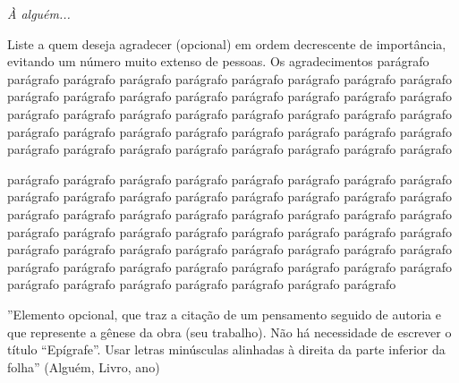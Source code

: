 
\begin{dedicatoria}
   \vspace*{\fill}
   \vspace*{\fill}
   \vspace*{\fill}
   \vspace*{\fill}
   \flushright
   \noindent
   \textit{À alguém...}
   \vspace*{48pt}
\end{dedicatoria}

\begin{agradecimentos}
Liste a quem deseja agradecer (opcional) em ordem decrescente de importância, evitando um número muito extenso de pessoas.
Os agradecimentos parágrafo parágrafo parágrafo parágrafo parágrafo parágrafo parágrafo parágrafo parágrafo parágrafo parágrafo parágrafo parágrafo parágrafo parágrafo parágrafo parágrafo parágrafo parágrafo parágrafo parágrafo parágrafo parágrafo parágrafo parágrafo parágrafo parágrafo parágrafo parágrafo parágrafo parágrafo parágrafo parágrafo parágrafo parágrafo parágrafo parágrafo parágrafo parágrafo parágrafo parágrafo 

parágrafo parágrafo parágrafo parágrafo parágrafo parágrafo parágrafo parágrafo parágrafo parágrafo parágrafo parágrafo parágrafo parágrafo parágrafo parágrafo parágrafo parágrafo parágrafo parágrafo parágrafo parágrafo parágrafo parágrafo parágrafo parágrafo parágrafo parágrafo parágrafo parágrafo parágrafo parágrafo parágrafo parágrafo parágrafo parágrafo parágrafo parágrafo parágrafo parágrafo parágrafo parágrafo parágrafo parágrafo parágrafo parágrafo parágrafo parágrafo parágrafo parágrafo parágrafo parágrafo parágrafo parágrafo parágrafo 

\end{agradecimentos}

\begin{epigrafe}
    \vspace*{\fill}
	\begin{flushright}
		''Elemento opcional, que traz a citação de um pensamento seguido de autoria e que represente a gênese da obra (seu trabalho). Não há necessidade de escrever o título “Epígrafe”. Usar letras minúsculas alinhadas à direita da parte inferior da folha'' (Alguém, Livro, ano)
        \vspace*{48pt}
	\end{flushright}
\end{epigrafe}